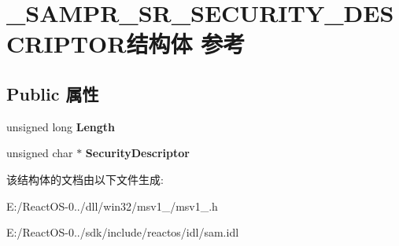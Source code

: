 \hypertarget{struct___s_a_m_p_r___s_r___s_e_c_u_r_i_t_y___d_e_s_c_r_i_p_t_o_r}{}\section{\+\_\+\+S\+A\+M\+P\+R\+\_\+\+S\+R\+\_\+\+S\+E\+C\+U\+R\+I\+T\+Y\+\_\+\+D\+E\+S\+C\+R\+I\+P\+T\+O\+R结构体 参考}
\label{struct___s_a_m_p_r___s_r___s_e_c_u_r_i_t_y___d_e_s_c_r_i_p_t_o_r}
\subsection*{Public 属性}
\begin{DoxyCompactItemize}
\item 
\mbox{\label{struct___s_a_m_p_r___s_r___s_e_c_u_r_i_t_y___d_e_s_c_r_i_p_t_o_r_a4cbc56e7255aa8811a1a4e1f6cb4bf68}} 
unsigned long {\bfseries Length}
\item 
\mbox{\label{struct___s_a_m_p_r___s_r___s_e_c_u_r_i_t_y___d_e_s_c_r_i_p_t_o_r_afcba668b0e610d78bfa1dedae75ebd73}} 
unsigned char $\ast$ {\bfseries Security\+Descriptor}
\end{DoxyCompactItemize}


该结构体的文档由以下文件生成\+:\begin{DoxyCompactItemize}
\item 
E\+:/\+React\+O\+S-\/0../dll/win32/msv1\+\_/msv1\+\_.\+h\item 
E\+:/\+React\+O\+S-\/0../sdk/include/reactos/idl/sam.\+idl\end{DoxyCompactItemize}
